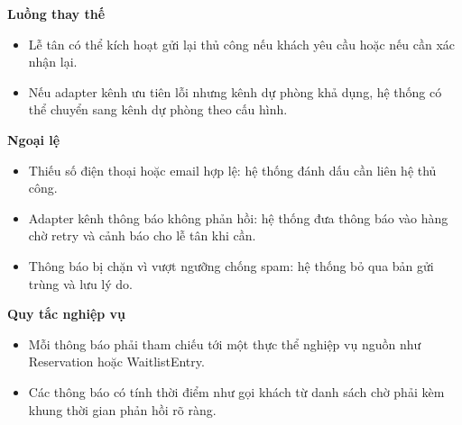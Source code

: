 \documentclass[11pt,a4paper]{article}
\begin{document}
\begin{usecasebox}[title={UC-RES-05 --- Gửi thông báo cho khách hàng}]
    \textbf{Luồng thay thế}
    \begin{itemize}[leftmargin=1.8em]
  \item Lễ tân có thể kích hoạt gửi lại thủ công nếu khách yêu cầu hoặc nếu cần xác nhận lại.
  \item Nếu adapter kênh ưu tiên lỗi nhưng kênh dự phòng khả dụng, hệ thống có thể chuyển sang kênh dự phòng theo cấu hình.
\end{itemize}

    \textbf{Ngoại lệ}
    \begin{itemize}[leftmargin=1.8em]
  \item Thiếu số điện thoại hoặc email hợp lệ: hệ thống đánh dấu cần liên hệ thủ công.
  \item Adapter kênh thông báo không phản hồi: hệ thống đưa thông báo vào hàng chờ retry và cảnh báo cho lễ tân khi cần.
  \item Thông báo bị chặn vì vượt ngưỡng chống spam: hệ thống bỏ qua bản gửi trùng và lưu lý do.
\end{itemize}

    \textbf{Quy tắc nghiệp vụ}
    \begin{itemize}[leftmargin=1.8em]
  \item Mỗi thông báo phải tham chiếu tới một thực thể nghiệp vụ nguồn như \textsf{Reservation} hoặc \textsf{WaitlistEntry}.
  \item Các thông báo có tính thời điểm như gọi khách từ danh sách chờ phải kèm khung thời gian phản hồi rõ ràng.
\end{itemize}
    \end{usecasebox}
\end{document}
